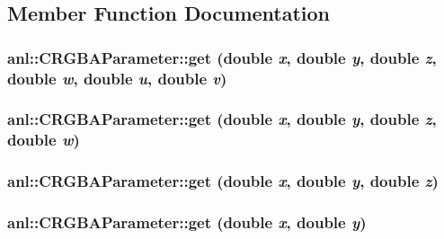 \subsection{Member Function Documentation}
\hypertarget{classanl_1_1CRGBAParameter_a3bbe14b12e8b577b90d94f45c12d8a66}{
\subsubsection[{get}]{ anl::CRGBAParameter::get (double {\em x}, \/  double {\em y}, \/  double {\em z}, \/  double {\em w}, \/  double {\em u}, \/  double {\em v})}}
\label{classanl_1_1CRGBAParameter_a3bbe14b12e8b577b90d94f45c12d8a66}
\hypertarget{classanl_1_1CRGBAParameter_ae47723228d7565636c99e414fd4afe1f}{
\subsubsection[{get}]{ anl::CRGBAParameter::get (double {\em x}, \/  double {\em y}, \/  double {\em z}, \/  double {\em w})}}
\label{classanl_1_1CRGBAParameter_ae47723228d7565636c99e414fd4afe1f}
\hypertarget{classanl_1_1CRGBAParameter_ae027fa3fd1b2ce2c45ba5a62e0f74002}{
\subsubsection[{get}]{ anl::CRGBAParameter::get (double {\em x}, \/  double {\em y}, \/  double {\em z})}}
\label{classanl_1_1CRGBAParameter_ae027fa3fd1b2ce2c45ba5a62e0f74002}
\hypertarget{classanl_1_1CRGBAParameter_a078b10c4c7d73a2a0be56335d6ee6f98}{
\subsubsection[{get}]{ anl::CRGBAParameter::get (double {\em x}, \/  double {\em y})}}
